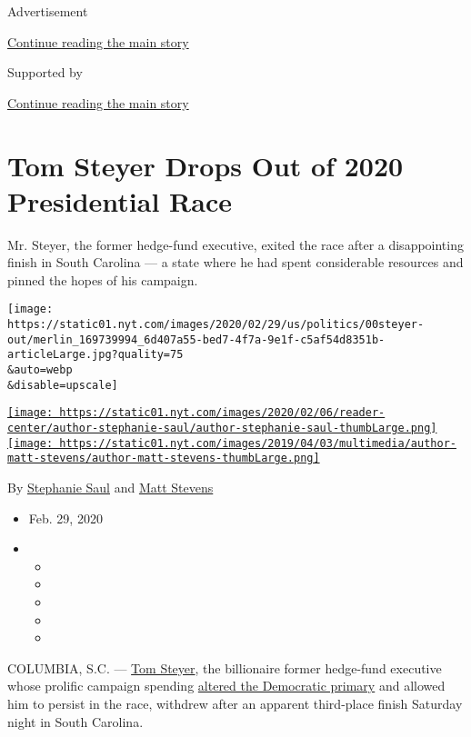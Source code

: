 Advertisement

\protect\hyperlink{after-top}{Continue reading the main story}

Supported by

\protect\hyperlink{after-sponsor}{Continue reading the main story}

\hypertarget{tom-steyer-drops-out-of-2020-presidential-race}{%
\section{Tom Steyer Drops Out of 2020 Presidential
Race}\label{tom-steyer-drops-out-of-2020-presidential-race}}

Mr. Steyer, the former hedge-fund executive, exited the race after a
disappointing finish in South Carolina --- a state where he had spent
considerable resources and pinned the hopes of his campaign.

\texttt{[image: https://static01.nyt.com/images/2020/02/29/us/politics/00steyer-out/merlin\_169739994\_6d407a55-bed7-4f7a-9e1f-c5af54d8351b-articleLarge.jpg?quality=75\\\&auto=webp\\\&disable=upscale]}

\href{https://www.nytimes.com/by/stephanie-saul}{\texttt{[image: https://static01.nyt.com/images/2020/02/06/reader-center/author-stephanie-saul/author-stephanie-saul-thumbLarge.png]}}\href{https://www.nytimes.com/by/matt-stevens}{\texttt{[image: https://static01.nyt.com/images/2019/04/03/multimedia/author-matt-stevens/author-matt-stevens-thumbLarge.png]}}

By \href{https://www.nytimes.com/by/stephanie-saul}{Stephanie Saul} and
\href{https://www.nytimes.com/by/matt-stevens}{Matt Stevens}

\begin{itemize}
\item
  Feb. 29, 2020
\item
  \begin{itemize}
  \item
  \item
  \item
  \item
  \item
  \end{itemize}
\end{itemize}

COLUMBIA, S.C. ---
\href{https://www.nytimes.com/interactive/2020/us/elections/tom-steyer.html}{Tom
Steyer}, the billionaire former hedge-fund executive whose prolific
campaign spending
\href{https://www.nytimes.com/2019/08/27/us/politics/tom-steyer-debate.html}{altered
the Democratic primary} and allowed him to persist in the race, withdrew
after an apparent third-place finish Saturday night in South Carolina.

